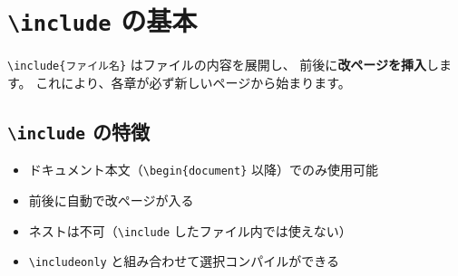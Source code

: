 % 

\chapter{\texttt{\textbackslash include} の基本}

\texttt{\textbackslash include\{ファイル名\}} はファイルの内容を展開し、
前後に\textbf{改ページを挿入}します。
これにより、各章が必ず新しいページから始まります。

\section{\texttt{\textbackslash include} の特徴}

\begin{itemize}
  \item ドキュメント本文（\texttt{\textbackslash begin\{document\}} 以降）でのみ使用可能
  \item 前後に自動で改ページが入る
  \item ネストは不可（\texttt{\textbackslash include} したファイル内では使えない）
  \item \texttt{\textbackslash includeonly} と組み合わせて選択コンパイルができる
\end{itemize}
